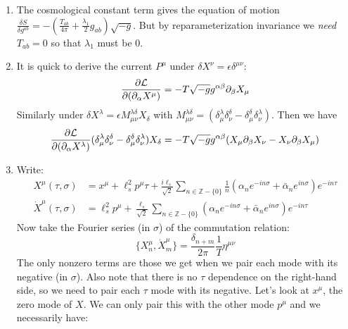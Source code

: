 \documentclass[11pt, class=article, crop=false]{standalone}
\begin{document}
\begin{enumerate}
		\item The cosmological constant term gives the equation of motion $\frac{\delta S}{\delta g^{ab}} = - (\frac{T_{ab}}{4\pi} + \frac{\lambda_1}{2} g_{ab}) \sqrt{-g}$. But by reparameterization invariance we \emph{need} $T_{ab} = 0$ so that $\lambda_1$ must be $0$.
		
		\item It is quick to derive the current $P^\mu$ under $\delta X^{\nu} = \epsilon \delta^{\mu \nu}$:
		\begin{equation}
			\frac{\partial \mathcal L}{\partial (\partial_\alpha X^\mu)} = -T \sqrt{-g} g^{\alpha \beta} \partial_\beta X_\mu
		\end{equation}
		Similarly under $\delta X^{\lambda} = \epsilon M_{\mu \nu}^{\lambda \delta} X_\delta$ with $M_{\mu \nu}^{\lambda \delta} = (\delta_\mu^\lambda \delta_\nu^{\delta} - \delta_\mu^{\delta} \delta_\nu^\lambda)$. Then we have 
		\begin{equation}
			\frac{\partial \mathcal L}{\partial (\partial_\alpha X^\lambda)} (\delta_\mu^\lambda \delta_\nu^{\delta} - \delta_\mu^{\delta} \delta_\nu^\lambda) X_\delta = -T \sqrt{-g} g^{\alpha \beta} (X_\mu \partial_\beta X_\nu - X_\nu \partial_\beta X_\mu)
		\end{equation}
		\item Write:
		\begin{equation}
			\begin{aligned}
				X^\mu(\tau, \sigma) &= x^\mu + \ell_s^2 p^\mu \tau + \frac{i \ell_s}{\sqrt 2} \sum_{n \in \mathbb Z - \{0\}} \frac{1}{n} (\alpha_n e^{-in\sigma} + \bar \alpha_{n} e^{i n \sigma}) e^{- i n \tau}\\
				\dot X^\mu(\tau, \sigma) &= \ell_s^2 p^\mu + \frac{\ell_s}{\sqrt 2} \sum_{n \in \mathbb Z - \{0\}} (\alpha_n e^{-in\sigma} + \bar \alpha_{n} e^{i n \sigma}) e^{- i n \tau}
			\end{aligned}
		\end{equation}
		Now take the Fourier series (in $\sigma$) of the commutation relation: 
		\begin{equation}
			\{X^\mu_{n}, \dot X^\mu_m\} = \frac{\delta_{n+m}}{2\pi} \frac{1}{T} \eta^{\mu \nu}
		\end{equation}
		The only nonzero terms are those we get when we pair each mode with its negative (in $\sigma$). Also note that there is no $\tau$ dependence on the right-hand side, so we need to pair each $\tau$ mode with its negative. Let's look at $x^\mu$, the zero mode of $X$. We can only pair this with the other mode $p^\mu$ and we necessarily have:
		\begin{equation}

\end{equation}
\end{enumerate}
\end{document}
